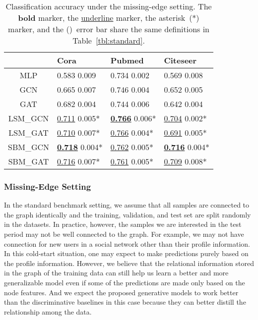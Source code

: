 \documentclass{article}
\begin{document}
\begin{table}[tb]
\centering
\caption{Classification accuracy under the missing-edge setting. The \textbf{bold} marker, the \underline{underline} marker, the asterisk~(*) marker, and the ()~error bar share the same definitions in Table~\ref{tbl:standard}.}
\label{tbl:missing}
\begin{tabular}{clll}
\toprule
{} &                                            Cora &                                          Pubmed &                                        Citeseer \\
\midrule
MLP     &                       0.583  \small{0.009} &                       0.734  \small{0.002} &                       0.569  \small{0.008} \\
GCN     &                       0.665  \small{0.007} &                       0.746  \small{0.004} &                       0.652  \small{0.005} \\
GAT     &                       0.682  \small{0.004} &                       0.744  \small{0.006} &                       0.642  \small{0.004} \\
\hline
LSM\_GCN &           \underline{0.711}  \small{0.005}* &  \underline{\textbf{0.766}}  \small{0.006}* &           \underline{0.704}  \small{0.002}* \\
LSM\_GAT &           \underline{0.710}  \small{0.007}* &           \underline{0.766}  \small{0.004}* &           \underline{0.691}  \small{0.005}* \\
SBM\_GCN &  \underline{\textbf{0.718}}  \small{0.004}* &           \underline{0.762}  \small{0.005}* &  \underline{\textbf{0.716}}  \small{0.004}* \\
SBM\_GAT &           \underline{0.716}  \small{0.007}* &           \underline{0.761}  \small{0.005}* &           \underline{0.709}  \small{0.008}* \\
\bottomrule
\end{tabular}

\end{table}

\subsubsection{Missing-Edge Setting}
\label{sec:me}

In the standard benchmark setting, we assume that all samples are connected to the graph identically and the training, validation, and test set are split randomly in the datasets. In practice, however, the samples we are interested in the test period may not be well connected to the graph. For example, we may not have connection for new users in a social network other than their profile information. In this cold-start situation, one may expect to make predictions purely based on the profile information. However, we believe that the relational information stored in the graph of the training data can still help us learn a better and more generalizable model even if some of the predictions are made only based on the node features. And we expect the proposed generative models to work better than the discriminative baselines in this case because they can better distill the relationship among the data. 
\end{document}
